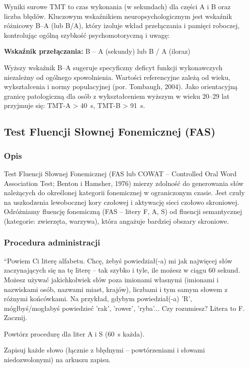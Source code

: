 \documentclass[11pt,a4paper]{article}
\begin{document}
Wyniki surowe TMT to czas wykonania (w sekundach) dla części A i B oraz liczba błędów. Kluczowym wskaźnikiem neuropsychologicznym jest wskaźnik różnicowy B--A (lub B/A), który izoluje wkład przełączania i pamięci roboczej, kontrolując ogólną szybkość psychomotoryczną i uwagę:

\textbf{Wskaźnik przełączania:} B -- A (sekundy) lub B / A (iloraz)

Wyższy wskaźnik B--A sugeruje specyficzny deficyt funkcji wykonawczych niezależny od ogólnego spowolnienia. Wartości referencyjne zależą od wieku, wykształcenia i normy populacyjnej (por. Tombaugh,
2004). Jako orientacyjną granicę patologiczną dla osób z wykształceniem wyższym w wieku 20–29 lat przyjmuje się: TMT-A > 40~s, TMT-B > 91~s.

\subsection{Test Fluencji Słownej Fonemicznej (FAS)}

\subsubsection{Opis}

Test Fluencji Słownej Fonemicznej (FAS lub COWAT -- Controlled Oral Word Association Test; Benton i Hamsher, 1976) mierzy zdolność do generowania słów należących do określonej kategorii fonemicznej w ograniczonym czasie. Jest czuły na uszkodzenia lewobocznej kory czołowej i aktywację sieci czołowo skroniowej. Odróżniamy fluencję fonemiczną (FAS -- litery F, A, S) od fluencji semantycznej (kategorie: zwierzęta, warzywa), która angażuje bardziej obszary skroniowe.

\subsubsection{Procedura administracji}

\begin{tcolorbox}[
  colback=white,
  colframe=NavyBlue,
  colbacktitle=NavyBlue,
  coltitle=white,
  fonttitle=\bfseries,
  title={Instrukcja werbalna -- FAS},
  arc=1mm,
  boxrule=0.8pt,
  left=6pt, right=6pt, top=6pt, bottom=6pt
]
``Powiem Ci literę alfabetu. Chcę, żebyś powiedział(-a) mi jak najwięcej słów zaczynających się na tę literę -- tak szybko i tyle, ile możesz w ciągu 60 sekund. Możesz używać jakichkolwiek słów poza imionami własnymi (imionami i nazwiskami osób, nazwami miast, krajów), liczbami i tym samym słowem z różnymi końcówkami. Na przykład, gdybym powiedział(-a) 'R', mógłbyś/mogłabyś powiedzieć 'rak', 'rower', 'ryba'... Czy rozumiesz? Litera to F. Zacznij.

\smallskip
Powtórz procedurę dla liter A i S (60~s każda).

\smallskip
Zapisuj każde słowo (łącznie z błędnymi -- powtórzeniami i słowami niedozwolonymi) na arkuszu zapisu.
\end{tcolorbox}
\end{document}
